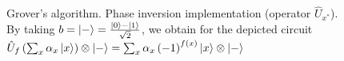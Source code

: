 \begin{figure}
\centering



\caption{Grover's algorithm. Phase inversion implementation (operator
  $\hat{U}_{x^\ast}$). By taking 
  $b=\ket{-} = \frac{\ket{0} -
    \ket{1}}{\sqrt{2}}$, we obtain for the depicted circuit
$\hat{U}_{f}\left(\sum_x \alpha_x \ket{x}\right)\otimes\ket{-} = 
\sum_x \alpha_x
\left(-1\right)^{f\left(x\right)}\ket{x}\otimes\ket{-}$} 
\label{figQuantCompGroverPhaseInvImpl}
\end{figure}